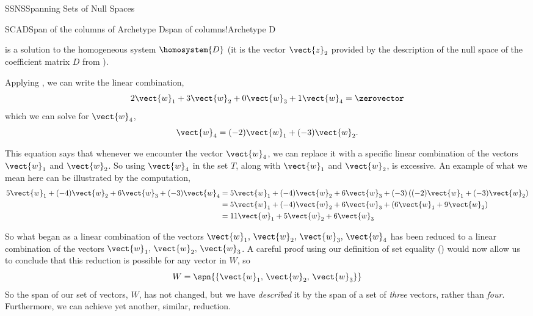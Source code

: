 \begin{subsect}{SSNS}{Spanning Sets of Null Spaces}
\begin{example}{SCAD}{Span of the columns of Archetype D}{span of columns!Archetype D}
\begin{para}
\begin{equation*}
\end{equation*}
%
is a solution to the homogeneous system $\homosystem{D}$ (it is the  vector $\vect{z}_2$ provided by the description of the null space of the coefficient matrix $D$ from ).\end{para}
%
\begin{para}Applying , we can write the linear combination,
%
\begin{equation*}
2\vect{w}_1+3\vect{w}_2+0\vect{w}_3+1\vect{w}_4=\zerovector
\end{equation*}
%
which we can solve for $\vect{w}_4$,
%
\begin{equation*}
\vect{w}_4=(-2)\vect{w}_1+(-3)\vect{w}_2.
\end{equation*}
\end{para}
%
\begin{para}This equation says that whenever we encounter the vector $\vect{w}_4$, we can replace it with a specific linear combination of the vectors $\vect{w}_1$ and $\vect{w}_2$.  So using $\vect{w}_4$ in the set $T$, along with $\vect{w}_1$ and $\vect{w}_2$, is excessive.  An example of what we mean here can be illustrated by the computation,
%
\begin{align*}
5\vect{w}_1+(-4)\vect{w}_2+6\vect{w}_3+(-3)\vect{w}_4&=
5\vect{w}_1+(-4)\vect{w}_2+6\vect{w}_3+(-3)\left((-2)\vect{w}_1+(-3)\vect{w}_2\right)\\
&=5\vect{w}_1+(-4)\vect{w}_2+6\vect{w}_3+\left(6\vect{w}_1+9\vect{w}_2\right)\\
&=11\vect{w}_1+5\vect{w}_2+6\vect{w}_3
\end{align*}\end{para}
%
\begin{para}So what began as a linear combination of the vectors $\vect{w}_1,\,\vect{w}_2,\,\vect{w}_3,\,\vect{w}_4$ has been reduced to a linear combination of the vectors $\vect{w}_1,\,\vect{w}_2,\,\vect{w}_3$.  A careful proof using our definition of set equality () would now allow us to conclude that this reduction is possible for any vector in $W$, so
%
\begin{equation*}
W=\spn{\left\{\vect{w}_1,\,\vect{w}_2,\,\vect{w}_3\right\}}
\end{equation*}
%
So the span of our set of vectors, $W$, has not changed, but we have {\em described} it by the span of a set of {\em three} vectors, rather than {\em four}.  Furthermore, we can achieve yet another, similar, reduction.\end{para}

\end{example}
\end{subsect}
